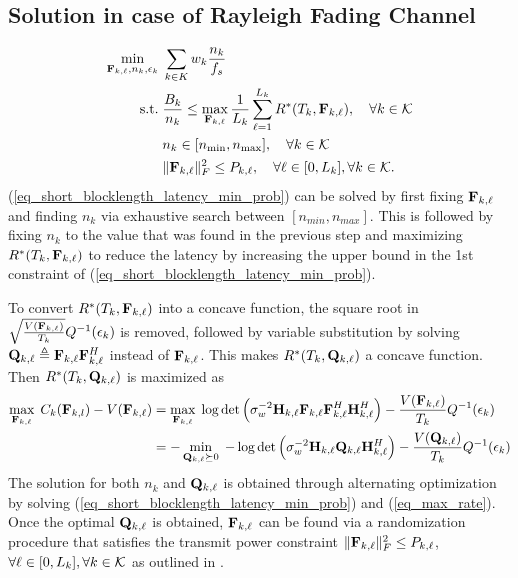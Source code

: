 \documentclass[a4paper, 12pt, onecolumn, journal, twoside, draftclsnofoot]{IEEEtran}
\begin{document}
\subsection{Solution in case of Rayleigh Fading Channel}
\begin{equation}
	\begin{split}
		\min_{{\bf F}_{k,\ell}, n_k, \epsilon_k} \;& \sum_{k \in K} w_k \frac{n_k}{f_s} \\
		\text{s.t.}\;& \frac{B_k}{n_k} \leq \max_{{\bf F}_{k, \ell}} \frac{1}{L_k} \sum_{\ell=1}^{L_k} 		R^*(T_{k}, {\bf F}_{k, \ell}), \quad \forall k \in { \mathcal{K} } \\ 
		& n_k \in [n_{\text{min}}, n_{\text{max}}], \quad \forall k \in { \mathcal{K} } \\
		& \|{\bf F}_{k,\ell}\|_F^2 \leq P_{k,\ell}, \quad \forall \ell \in [0, L_k],  \forall k \in { \mathcal{K} }.
	\end{split}
\label{eq_short_blocklength_latency_min_prob}
\end{equation}
(\ref{eq_short_blocklength_latency_min_prob}) can be solved by first fixing ${\bf F}_{k,\ell}$ and finding $n_k$ via exhaustive search between $[n_{min}, n_{max}]$.  This is followed by fixing $n_k$ to the value that was found in the previous step and maximizing $R^*(T_k, {\bf F}_{k,\ell})$ to reduce the latency by increasing the upper bound in the 1st constraint of (\ref{eq_short_blocklength_latency_min_prob}). 

To convert  $R^*(T_k, {\bf F}_{k,\ell})$ into a concave function, the square root in $\sqrt{\frac{V({\bf F}_{k,\ell})}{T_k}} Q^{-1}{(\epsilon_k)}$ is removed, followed by variable substitution by solving ${\bf Q}_{k,\ell} \triangleq {\bf F}_{k,\ell}{\bf F}_{k,\ell}^H$ instead of ${\bf F}_{k,\ell}$.  This makes $R^*(T_k, {\bf Q}_{k,\ell})$ a concave function. Then $R^*(T_k, {\bf Q}_{k,\ell})$ is maximized as 
\begin{equation}
	\begin{split}
		\max_{{\bf F}_{k,\ell}}  \; C_k({\bf F}_{k,l}) - V({\bf F}_{k,\ell}) 
&=  \max_{{\bf F}_{k,\ell}} \; \log \det \Big( \sigma_w^{-2} {\bf H}_{k,\ell} {\bf F}_{k,\ell} {\bf F}_{k,\ell}^H {\bf H}_{k,\ell}^H \Big)
   - \frac{V({\bf F}_{k,\ell})}{T_k} Q^{-1}(\epsilon_k) \\
&= - \min_{{\bf Q}_{k,\ell} \succeq 0} \; - \log \det \Big( \sigma_w^{-2} {\bf H}_{k,\ell} {\bf Q}_{k,\ell} {\bf H}_{k,\ell}^H \Big)
   - \frac{V({\bf Q}_{k,\ell})}{T_k} Q^{-1}(\epsilon_k)
	\end{split}
\label{eq_max_rate}
\end{equation}
The solution for both $n_k$ and ${\bf Q}_{k,\ell}$ is obtained through alternating optimization by solving (\ref{eq_short_blocklength_latency_min_prob}) and (\ref{eq_max_rate}).  Once the optimal ${\bf Q}_{k,\ell}$ is obtained, ${\bf F}_{k,\ell}$ can be found via a randomization procedure that satisfies the transmit power constraint $\|{\bf F}_{k,\ell}\|_F^2 \leq P_{k,\ell}$, $\forall \ell \in [0, L_k],  \forall k \in { \mathcal{K} }$ as outlined in \cite{chang2015semm}.
\end{document}
